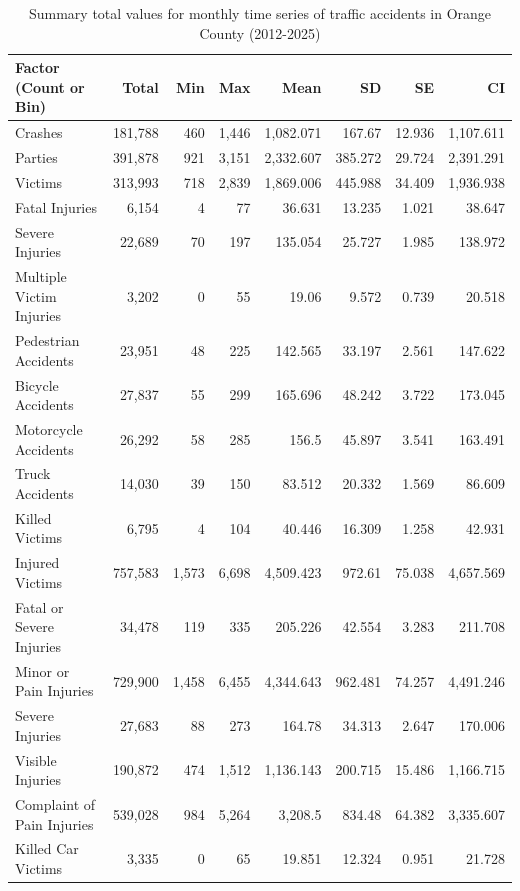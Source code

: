 \begin{table}[h!]
\caption{Summary total values for monthly time series of traffic accidents in Orange County (2012-2025)}
\label{tbl3}
\begin{tabular}{lrrrrrrr}
\toprule
Factor (Count or Bin) & Total\footnotemark[2] & Min\footnotemark[1] & Max\footnotemark[1] & Mean\footnotemark[1] & SD\footnotemark[1] & SE\footnotemark[1] & CI\footnotemark[1] \\
\midrule
Crashes & 181,788 & 460 & 1,446 & 1,082.071 & 167.67 & 12.936 & 1,107.611 \\
Parties & 391,878 & 921 & 3,151 & 2,332.607 & 385.272 & 29.724 & 2,391.291 \\
Victims & 313,993 & 718 & 2,839 & 1,869.006 & 445.988 & 34.409 & 1,936.938 \\
Fatal Injuries & 6,154 & 4 & 77 & 36.631 & 13.235 & 1.021 & 38.647 \\
Severe Injuries & 22,689 & 70 & 197 & 135.054 & 25.727 & 1.985 & 138.972 \\
Multiple Victim Injuries & 3,202 & 0 & 55 & 19.06 & 9.572 & 0.739 & 20.518 \\
\midrule
Pedestrian Accidents & 23,951 & 48 & 225 & 142.565 & 33.197 & 2.561 & 147.622 \\
Bicycle Accidents & 27,837 & 55 & 299 & 165.696 & 48.242 & 3.722 & 173.045 \\
Motorcycle Accidents & 26,292 & 58 & 285 & 156.5 & 45.897 & 3.541 & 163.491 \\
Truck Accidents & 14,030 & 39 & 150 & 83.512 & 20.332 & 1.569 & 86.609 \\
\midrule
Killed Victims & 6,795 & 4 & 104 & 40.446 & 16.309 & 1.258 & 42.931 \\
Injured Victims & 757,583 & 1,573 & 6,698 & 4,509.423 & 972.61 & 75.038 & 4,657.569 \\
Fatal or Severe Injuries & 34,478 & 119 & 335 & 205.226 & 42.554 & 3.283 & 211.708 \\
Minor or Pain Injuries & 729,900 & 1,458 & 6,455 & 4,344.643 & 962.481 & 74.257 & 4,491.246 \\
Severe Injuries & 27,683 & 88 & 273 & 164.78 & 34.313 & 2.647 & 170.006 \\
Visible Injuries & 190,872 & 474 & 1,512 & 1,136.143 & 200.715 & 15.486 & 1,166.715 \\
Complaint of Pain Injuries & 539,028 & 984 & 5,264 & 3,208.5 & 834.48 & 64.382 & 3,335.607 \\
\midrule
Killed Car Victims & 3,335 & 0 & 65 & 19.851 & 12.324 & 0.951 & 21.728 \\

\end{tabular}
\end{table}
